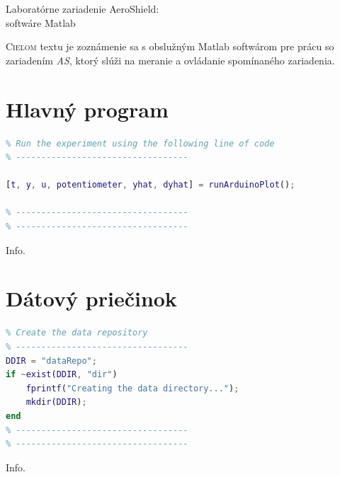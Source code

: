 \documentclass[a4paper, 10pt, ]{article}
\begin{document}
\begin{flushleft}
    Laboratórne zariadenie AeroShield:\\ softwáre Matlab
\end{flushleft}

\bigskip

\normalsize
\normalfont

\lstset{style=mystyle}










\noindent
\lettrine[lines=1, nindent=1pt, loversize=0.0]{C}{ieľom}
textu je zoznámenie sa s obslužným Matlab softwárom pre prácu so zariadením \emph{AS}, ktorý slúži na meranie a ovládanie spomínaného zariadenia.


\section{Hlavný program}
\begin{lstlisting}[caption=Zavolanie funkcie merania., label={code:main}, language=Matlab]
% ----------------------------------
% Run the experiment using the following line of code
% ----------------------------------

[t, y, u, potentiometer, yhat, dyhat] = runArduinoPlot();

% ----------------------------------
% ----------------------------------
\end{lstlisting}

Info.

\section{Dátový priečinok}
\begin{lstlisting}[caption=Vytvorenie dátového priečinku., label={code:repo}, language=Matlab]
% ----------------------------------
% Create the data repository
% ----------------------------------
DDIR = "dataRepo";
if ~exist(DDIR, "dir")
    fprintf("Creating the data directory...");
    mkdir(DDIR);
end
% ----------------------------------
% ----------------------------------
\end{lstlisting}

Info.
\end{document}
